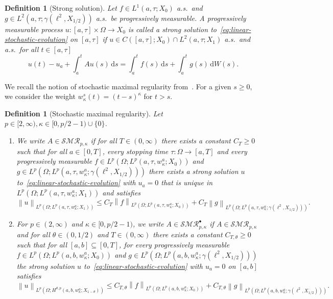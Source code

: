 \documentclass[reqno]{amsart}
\newtheorem{definition}[Satz]{Definition}
\newcommand{\seq}{\subseteq}
\newcommand{\1}{\mathbf{1}}
\newcommand{\dd}{\ensuremath{\mathrm{d}}}
\newcommand{\nrm}[1]{\left\lVert #1 \right\rVert}
\begin{document}
\begin{definition}[Strong solution]\label{def:linear:see:solution:strong}
    Let $f\in L^1(a,\tau;X_0)$ a.s.\ and $g\in L^2(a,\tau;\gamma(\ell^2,X_{1/2}))$ a.s.\ be progressively measurable. A progressively measurable process $u\colon[a,\tau]\times\Omega\to X_0$ is called a \emph{strong solution} to~\eqref{eq:linear-stochastic-evolution} on $[a,\tau]$ if $u\in C([a,\tau];X_0)\cap L^2(a,\tau;X_1)$ a.s.\ and a.s.\ for all $t\in [a,\tau]$ 
    $$u(t)-u_a +\int_a^t Au(s)\, \dd s = \int_a^t f(s)\,\dd s+ \int_a^t g(s)\,\dd W(s).$$
\end{definition}
We recall the notion of stochastic maximal regularity from~\cite{agrestiNonlinearSPDEsMaximal2025}. For a given $s\ge0$, we consider the weight $w_\kappa^s(t)= (t-s)^\kappa$ for $t>s$.
\begin{definition}[Stochastic maximal regularity]
    Let $p\in [2,\infty), \kappa\in [0,p/2-1)\cup\{0\}$.
    \begin{enumerate}
        \item We write $A\in \mathcal{SMR}_{p,\kappa}$ if for all $T\in (0,\infty)$ there exists a constant $C_T\ge 0$ such that for all $a\in [0,T]$, every stopping time $\tau\colon\Omega\to [a,T]$ and every progressively measurable $f\in L^p(\Omega;L^p(a,\tau,w_\kappa^a;X_0))$ and $g\in L^p(\Omega;L^p(a,\tau,w_\kappa^a;\gamma(\ell^2,X_{1/2})))$ there exists a strong solution $u$ to~\eqref{eq:linear-stochastic-evolution} with $u_a=0$ that is unique in $L^p(\Omega;L^p(a,\tau,w_\kappa^a;X_1))$ and satisfies
        \begin{equation}
            \nrm{u}_{L^p(\Omega;L^p(a,\tau,w_\kappa^a;X_1))}\le C_T\nrm{f}_{L^p(\Omega;L^p(a,\tau,w_\kappa^a;X_0))}+C_T\nrm{g}_{L^p(\Omega;L^p(a,\tau,w_\kappa^a;\gamma(\ell^2,X_{1/2})))}.
        \end{equation}
        \item For $p\in(2,\infty)$ and $ \kappa\in [0,p/2-1)$, we write $A\in \mathcal{SMR}_{p,\kappa}^\bullet$ if $A\in \mathcal{SMR}_{p,\kappa}$ and for all $\theta\in(0,1/2)$ and $T\in (0,\infty)$ there exists a constant $C_{T,\theta}\ge 0$ such that for all $[a,b]\seq[0,T]$, for every progressively measurable $f\in L^p(\Omega;L^p(a,b,w_\kappa^a;X_0))$ and $g\in L^p(\Omega;L^p(a,b,w_\kappa^a;\gamma(\ell^2,X_{1/2})))$ the strong solution $u$ to~\eqref{eq:linear-stochastic-evolution} with $u_a=0$ on $[a,b]$ satisfies
        \begin{equation}
            \nrm{u}_{L^p(\Omega;H^{\theta,p}(a,b,w_\kappa^a;X_{1-\theta}))}\le C_{T,\theta}\nrm{f}_{L^p(\Omega;L^p(a,b,w_\kappa^a;X_0))}+C_{T,\theta}\nrm{g}_{L^p(\Omega;L^p(a,b,w_\kappa^a;\gamma(\ell^2,X_{1/2})))}.

\end{equation}
\end{enumerate}
\end{definition}
\end{document}
